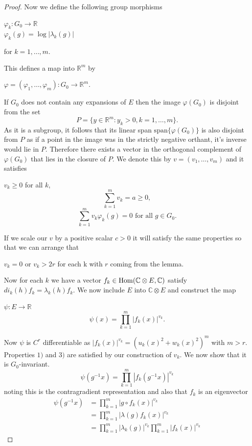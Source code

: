 \begin{proof}
    Now we define the following group morphisms
    \begin{center}
        $\varphi_k : G_0 \to \mathbb{R}$\\
        $ \varphi_k(g) = \log|\lambda_k(g)|$
    \end{center}
    for $k = 1,\dots, m$.

    This defines a map into $\mathbb{R}^m$ by
    \begin{center}
        $\varphi=(\varphi_1 , \dots , \varphi_m): G_0 \to \mathbb{R}^m.$
    \end{center}
    If $G_0$ does not contain any expansions of $E$ then the image $\varphi(G_0)$ is disjoint from the set
    $$
        P = \{y \in \mathbb{R}^m: y_k>0, k=1,\dots ,m\}.
    $$
    As it is a subgroup, it follows that its linear span $\text{span}\{\varphi(G_0)\}$ is also disjoint from $P$ as if a point in the image was
    in the strictly negative orthant, it's inverse would lie in $P$. Therefore there exists a vector in the orthogonal complement
    of $\varphi(G_0)$ that lies in the closure of $P$. We denote this by $v = (v_1,\dots, v_m)$ and it satisfies
    \begin{center}
        $v_k \geq 0$ for all $k$,
        \[\sum^m_{k=1}v_k = a \geq 0,\]
        \[\sum^m_{k=1}v_k\varphi_k(g) =0 \text{ for all } g\in G_0.\]
    \end{center}
    If we scale our $v$ by a positive scalar $c>0$ it will satisfy the same properties so that we can arrange that
    \begin{center}
        $v_k =0$ or $v_k>2r$ for each k with $r$ coming from the lemma.

        Now for each $k$ we have a vector $f_k\in \operatorname{Hom}(\mathbb{C}\otimes E,
            \mathbb{C})$ satisfy $di_k(h)f_k = \lambda_k(h)f_k$. We now include $E$ into
        $\mathbb{C}\otimes E$ and construct the map
        \begin{center}
            $\psi: E \to \mathbb{R}$
            \[\psi(x) = \prod_{k=1}^{m}|f_k(x)|^{v_k}.\]
        \end{center}
    \end{center}
    Now $\psi$ is $C^r$ differentiable as $|f_k(x)|^{v_k} = (u_k(x)^2 + w_k(x)^2)^m$ with $m>r$. Properties
    $1)$ and $3)$ are satisfied by our construction of $v_k$. We now show that it is $G_0$-invariant.
    \[\psi(g^{-1}x) = \prod_{k=1}^{m}|f_k(g^{-1}x)|^{v_k} \]
    noting this is the contragradient representation and also that $f_k$ is an
    eigenvector
    \begin{align*}
        \psi(g^{-1}x) & = \prod_{k=1}^{m}|g\circ f_k(x)|^{v_k}                             \\
                      & = \prod_{k=1}^{m}|\lambda(g)f_k(x)|^{v_k}                          \\
                      & = \prod_{k=1}^{m}|\lambda_k(g)|^{v_k}\prod_{k=1}^{m}|f_k(x)|^{v_k}
    \end{align*}


\end{proof}
